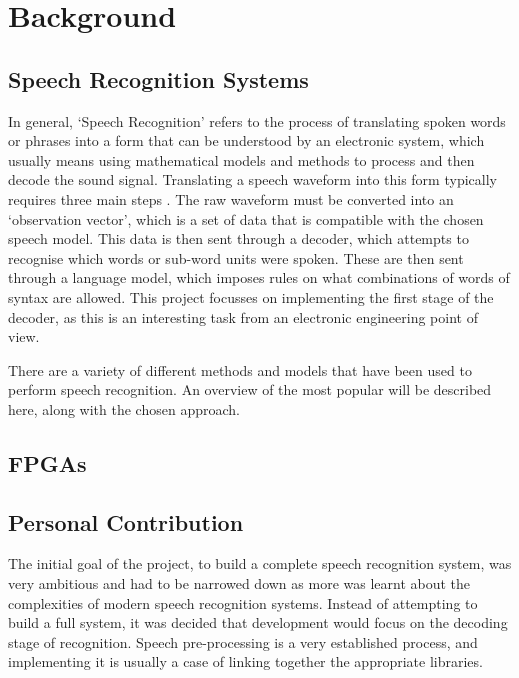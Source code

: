 \chapter{Background} %
\label{cha:background}

\section{Speech Recognition Systems} %
\label{sec:speech_recognition_systems}
	In general, `Speech Recognition' refers to the process of translating spoken words or phrases into a form that can be understood by an electronic system, which usually means using mathematical models and methods to process and then decode the sound signal.  Translating a speech waveform into this form typically requires three main steps \cite{melnikoff2003speech}.  The raw waveform must be converted into an `observation vector', which is a set of data that is compatible with the chosen speech model.  This data is then sent through a decoder, which attempts to recognise which words or sub-word units were spoken.  These are then sent through a language model, which imposes rules on what combinations of words of syntax are allowed.  This project focusses on implementing the first stage of the decoder, as this is an interesting task from an electronic engineering point of view.

	There are a variety of different methods and models that have been used to perform speech recognition.  An overview of the most popular will be described here, along with the chosen approach.


\section{FPGAs} %
\label{sec:fpgas}



\section{Personal Contribution} %
\label{sec:personal_contribution}
	The initial goal of the project, to build a complete speech recognition system, was very ambitious and had to be narrowed down as more was learnt about the complexities of modern speech recognition systems.  Instead of attempting to build a full system, it was decided that development would focus on the decoding stage of recognition.  Speech pre-processing is a very established process, and implementing it is usually a case of linking together the appropriate libraries.

